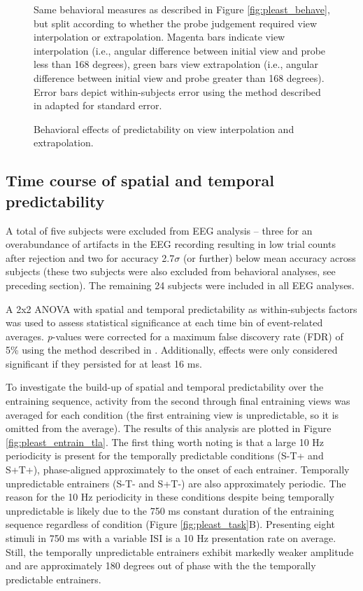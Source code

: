 \documentclass[dwyatte_dissertation.tex]{subfiles}
\begin{document}
\begin{figure}[h!]
\begin{center}
\begin{tabular}{ll}
\end{tabular}
\end{center}
\caption{Behavioral effects of predictability on view interpolation and extrapolation.}{Same behavioral measures as described in Figure \ref{fig:pleast_behave}, but split according to whether the probe judgement required view interpolation or extrapolation. Magenta bars indicate view interpolation (i.e., angular difference between initial view and probe less than 168 degrees), green bars view extrapolation (i.e., angular difference between initial view and probe greater than 168 degrees). Error bars depict within-subjects error using the method described in \protect{} adapted for standard error.}
\label{fig:pleast_behave_angle}
\end{figure}

\subsection{Time course of spatial and temporal predictability}
A total of five subjects were excluded from EEG analysis -- three for an overabundance of artifacts in the EEG recording resulting in low trial counts after rejection and two for accuracy 2.7$\sigma$ (or further) below mean accuracy across subjects (these two subjects were also excluded from behavioral analyses, see preceding section). The remaining 24 subjects were included in all EEG analyses. 

A 2x2 ANOVA with spatial and temporal predictability as within-subjects factors was used to assess statistical significance at each time bin of event-related averages. \textit{p}-values were corrected for a maximum false discovery rate (FDR) of 5\% using the method described in . Additionally, effects were only considered significant if they persisted for at least 16 ms.

To investigate the build-up of spatial and temporal predictability over the entraining sequence, activity from the second through final entraining views was averaged for each condition (the first entraining view is unpredictable, so it is omitted from the average). The results of this analysis are plotted in Figure \ref{fig:pleast_entrain_tla}. The first thing worth noting is that a large 10 Hz periodicity is present for the temporally predictable conditions (S-T+ and S+T+), phase-aligned approximately to the onset of each entrainer. Temporally unpredictable entrainers (S-T- and S+T-) are also approximately periodic. The reason for the 10 Hz periodicity in these conditions despite being temporally unpredictable is likely due to the 750 ms constant duration of the entraining sequence regardless of condition (Figure \ref{fig:pleast_task}B). Presenting eight stimuli in 750 ms with a variable ISI is a 10 Hz presentation rate on average. Still, the temporally unpredictable entrainers exhibit markedly weaker amplitude and are approximately 180 degrees out of phase with the the temporally predictable entrainers.
\end{document}
